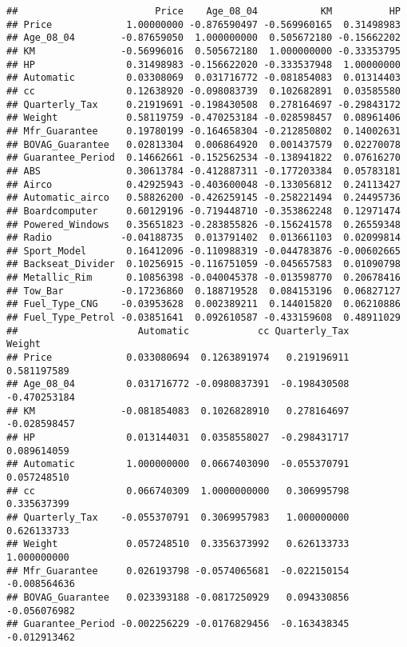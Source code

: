 \documentclass[]{article}
\begin{document}
\begin{verbatim}
##                        Price    Age_08_04           KM          HP
## Price             1.00000000 -0.876590497 -0.569960165  0.31498983
## Age_08_04        -0.87659050  1.000000000  0.505672180 -0.15662202
## KM               -0.56996016  0.505672180  1.000000000 -0.33353795
## HP                0.31498983 -0.156622020 -0.333537948  1.00000000
## Automatic         0.03308069  0.031716772 -0.081854083  0.01314403
## cc                0.12638920 -0.098083739  0.102682891  0.03585580
## Quarterly_Tax     0.21919691 -0.198430508  0.278164697 -0.29843172
## Weight            0.58119759 -0.470253184 -0.028598457  0.08961406
## Mfr_Guarantee     0.19780199 -0.164658304 -0.212850802  0.14002631
## BOVAG_Guarantee   0.02813304  0.006864920  0.001437579  0.02270078
## Guarantee_Period  0.14662661 -0.152562534 -0.138941822  0.07616270
## ABS               0.30613784 -0.412887311 -0.177203384  0.05783181
## Airco             0.42925943 -0.403600048 -0.133056812  0.24113427
## Automatic_airco   0.58826200 -0.426259145 -0.258221494  0.24495736
## Boardcomputer     0.60129196 -0.719448710 -0.353862248  0.12971474
## Powered_Windows   0.35651823 -0.283855826 -0.156241578  0.26559348
## Radio            -0.04188735  0.013791402  0.013661103  0.02099814
## Sport_Model       0.16412096 -0.110988319 -0.044783876 -0.00602665
## Backseat_Divider  0.10256915 -0.116751059 -0.045657583  0.01090798
## Metallic_Rim      0.10856398 -0.040045378 -0.013598770  0.20678416
## Tow_Bar          -0.17236860  0.188719528  0.084153196  0.06827127
## Fuel_Type_CNG    -0.03953628  0.002389211  0.144015820  0.06210886
## Fuel_Type_Petrol -0.03851641  0.092610587 -0.433159608  0.48911029
##                     Automatic            cc Quarterly_Tax       Weight
## Price             0.033080694  0.1263891974   0.219196911  0.581197589
## Age_08_04         0.031716772 -0.0980837391  -0.198430508 -0.470253184
## KM               -0.081854083  0.1026828910   0.278164697 -0.028598457
## HP                0.013144031  0.0358558027  -0.298431717  0.089614059
## Automatic         1.000000000  0.0667403090  -0.055370791  0.057248510
## cc                0.066740309  1.0000000000   0.306995798  0.335637399
## Quarterly_Tax    -0.055370791  0.3069957983   1.000000000  0.626133733
## Weight            0.057248510  0.3356373992   0.626133733  1.000000000
## Mfr_Guarantee     0.026193798 -0.0574065681  -0.022150154 -0.008564636
## BOVAG_Guarantee   0.023393188 -0.0817250929   0.094330856 -0.056076982
## Guarantee_Period -0.002256229 -0.0176829456  -0.163438345 -0.012913462

\end{verbatim}
\end{document}
